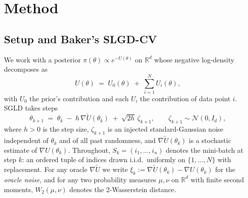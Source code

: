 \section{Method}
\label{sec:method}

\subsection{Setup and Baker's SLGD-CV}
We work with a posterior $\pi(\theta)\propto e^{-U(\theta)}$ on $\mathbb R^d$ whose negative log-density decomposes as
\begin{equation}
  U(\theta) \;=\; U_0(\theta) \;+\; \sum_{i=1}^N U_i(\theta),
  \label{eq:decomp}
\end{equation}
with $U_0$ the prior's contribution and each $U_i$ the contribution of data point $i$. SGLD takes steps
\begin{equation}
  \theta_{k+1} \;=\; \theta_k \;-\; h\,\nabla\tilde U(\theta_k) \;+\; \sqrt{2h}\,\zeta_{k+1}, \qquad \zeta_{k+1}\sim\mathcal N(0,I_d),
  \label{eq:sgld}
\end{equation}
where $h>0$ is the step size, $\zeta_{k+1}$ is an injected standard-Gaussian noise independent of $\theta_k$ and of all past randomness, and $\nabla\tilde U(\theta_k)$ is a stochastic estimate of $\nabla U(\theta_k)$. Throughout, $S_k=(i_1,\dots,i_n)$ denotes the mini-batch at step $k$: an ordered tuple of indices drawn i.i.d.\ uniformly on $\{1,\dots,N\}$ with replacement. For any oracle $\nabla\tilde U$ we write $\xi_k:=\nabla\tilde U(\theta_k)-\nabla U(\theta_k)$ for the \emph{oracle noise}, and for any two probability measures $\mu,\nu$ on $\mathbb R^d$ with finite second moments, $W_2(\mu,\nu)$ denotes the 2-Wasserstein distance.


